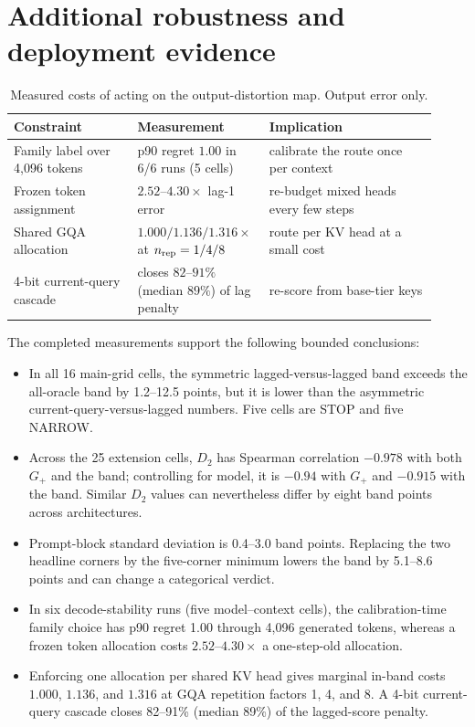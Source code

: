 \section{Additional robustness and deployment evidence}
\label{app:robustness}

\begin{table}[h]
\centering
\small
\setlength{\tabcolsep}{4pt}
\caption{Measured costs of acting on the output-distortion map. Output error only.}
\label{tab:deployment}
\begin{tabular}{@{}p{0.29\linewidth}p{0.25\linewidth}p{0.38\linewidth}@{}}
\toprule
\textbf{Constraint} & \textbf{Measurement} & \textbf{Implication} \\
\midrule
Family label over 4,096 tokens & p90 regret $1.00$ in 6/6 runs (5 cells) & calibrate the route once per context \\
Frozen token assignment & $2.52$--$4.30\times$ lag-1 error & re-budget mixed heads every few steps \\
Shared GQA allocation & $1.000/1.136/1.316\times$ at $n_{\rm rep}=1/4/8$ & route per KV head at a small cost \\
4-bit current-query cascade & closes $82$--$91\%$ (median $89\%$) of lag penalty & re-score from base-tier keys \\
\bottomrule
\end{tabular}
\end{table}


The completed measurements support the following bounded conclusions:
\begin{itemize}
 \item In all 16 main-grid cells, the symmetric lagged-versus-lagged band exceeds the
 all-oracle band by 1.2--12.5 points, but it is lower than the asymmetric
 current-query-versus-lagged numbers.  Five cells are STOP and five NARROW.
 \item Across the 25 extension cells, $D_2$ has Spearman correlation $-0.978$ with both
 $G_+$ and the band; controlling for model, it is $-0.94$ with $G_+$ and
 $-0.915$ with the band.  Similar $D_2$
 values can nevertheless differ by eight band points across architectures.
 \item Prompt-block standard deviation is 0.4--3.0 band points.  Replacing the
 two headline corners by the five-corner minimum lowers the band by 5.1--8.6
 points and can change a categorical verdict.
 \item In six decode-stability runs (five model--context cells), the calibration-time family choice has p90 regret 1.00
 through 4,096 generated tokens, whereas a frozen token allocation costs
 $2.52$--$4.30\times$ a one-step-old allocation.
 \item Enforcing one allocation per shared KV head gives marginal in-band costs
 $1.000$, $1.136$, and $1.316$ at GQA repetition factors 1, 4, and 8.  A 4-bit
 current-query cascade closes 82--91\% (median 89\%) of the lagged-score penalty.
\end{itemize}

